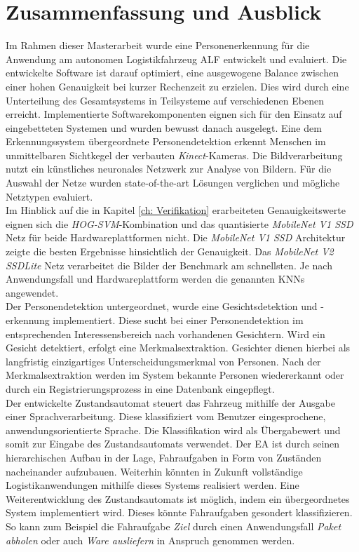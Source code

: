 \chapter{Zusammenfassung und Ausblick}
\label{Fazit und Ausblick}
	
Im Rahmen dieser Masterarbeit wurde eine Personenerkennung für die Anwendung am autonomen Logistikfahrzeug ALF entwickelt und evaluiert. Die entwickelte Software ist darauf optimiert, eine ausgewogene Balance zwischen einer hohen Genauigkeit bei kurzer Rechenzeit zu erzielen. Dies wird durch eine Unterteilung des Gesamtsystems in Teilsysteme auf verschiedenen Ebenen erreicht. Implementierte Softwarekomponenten eignen sich für den Einsatz auf eingebetteten Systemen und wurden bewusst danach ausgelegt. Eine dem Erkennungssystem übergeordnete Personendetektion erkennt Menschen im unmittelbaren Sichtkegel der verbauten \textit{Kinect}-Kameras. Die Bildverarbeitung nutzt ein künstliches neuronales Netzwerk zur Analyse von Bildern. Für die Auswahl der Netze wurden state-of-the-art Lösungen verglichen und mögliche Netztypen evaluiert.\\

Im Hinblick auf die in Kapitel \ref{ch: Verifikation} erarbeiteten Genauigkeitswerte eignen sich die \textit{HOG-SVM}-Kombination und das quantisierte \textit{MobileNet V1 SSD} Netz für beide Hardwareplattformen nicht. Die \textit{MobileNet V1 SSD} Architektur zeigte die besten Ergebnisse hinsichtlich der Genauigkeit. Das \textit{MobileNet V2 SSDLite} Netz verarbeitet die Bilder der Benchmark am schnellsten. Je nach Anwendungsfall und Hardwareplattform werden die genannten KNNs angewendet.     \\

Der Personendetektion untergeordnet, wurde eine Gesichtsdetektion und -erkennung implementiert. Diese sucht bei einer Personendetektion im entsprechenden Interessensbereich nach vorhandenen Gesichtern. Wird ein Gesicht detektiert, erfolgt eine Merkmalsextraktion. Gesichter dienen hierbei als langfristig einzigartiges Unterscheidungsmerkmal von Personen. Nach der Merkmalsextraktion werden im System bekannte Personen wiedererkannt oder durch ein Registrierungsprozess in eine Datenbank eingepflegt.\\

Der entwickelte Zustandsautomat steuert das Fahrzeug mithilfe der Ausgabe einer Sprachverarbeitung. Diese klassifiziert vom Benutzer eingesprochene, anwendungsorientierte Sprache. Die Klassifikation wird als Übergabewert und somit zur Eingabe des Zustandsautomats verwendet. Der EA ist durch seinen hierarchischen Aufbau in der Lage, Fahraufgaben in Form von Zuständen nacheinander aufzubauen. Weiterhin könnten in Zukunft vollständige Logistikanwendungen mithilfe dieses Systems realisiert werden. Eine Weiterentwicklung des Zustandsautomats ist möglich, indem ein übergeordnetes System implementiert wird. Dieses könnte Fahraufgaben gesondert klassifizieren. So kann zum Beispiel die Fahraufgabe \textit{Ziel} durch einen Anwendungsfall \textit{Paket abholen} oder auch \textit{Ware ausliefern} in Anspruch genommen werden.\\

